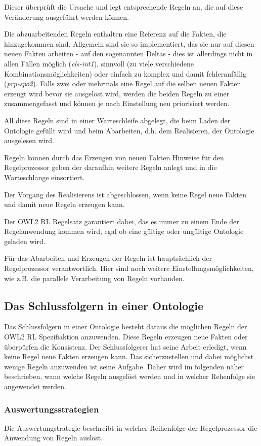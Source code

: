 Dieser überprüft die Ursache und legt entsprechende Regeln an, die auf diese Veränderung ausgeführt werden können.

Die abzuarbeitenden Regeln enthalten eine Referenz auf die Fakten, die hinzugekommen sind. Allgemein sind sie so implementiert, das sie nur auf diesen neuen Fakten arbeiten -  auf den sogenannten Deltas - dies ist allerdings nicht in allen Fällen möglich (\emph{cls-int1}), sinnvoll (zu viele verschiedene Kombinationsmöglichkeiten) oder einfach zu komplex und damit fehleranfällig (\emph{prp-spo2}). Falls zwei oder mehrmals eine Regel auf die selben neuen Fakten erzeugt wird bevor sie ausgelöst wird, werden die beiden Regeln zu einer zusammengefasst und können je nach Einstellung neu priorisiert werden.

All diese Regeln sind in einer Warteschleife abgelegt, die beim Laden der Ontologie gefüllt wird und beim Abarbeiten, d.h. dem Realisieren, der Ontologie ausgelesen wird.

Regeln können durch das Erzeugen von neuen Fakten Hinweise für den Regelprozessor geben der daraufhin weitere Regeln anlegt und in die Warteschlange einsortiert.

Der Vorgang des Realisierens ist abgeschlossen, wenn keine Regel neue Fakten und damit neue Regeln erzeugen kann.

Der OWL2 RL Regelsatz garantiert dabei, das es immer zu einem Ende der Regelanwendung kommen wird, egal ob eine gültige oder ungültige Ontologie geladen wird.

Für das Abarbeiten und Erzeugen der Regeln ist hauptsächlich der Regelprozessor verantwortlich. Hier sind noch weitere Einstellungsmöglichkeiten, wie z.B. die parallele Verarbeitung von Regeln vorhanden.


\subsection{Das Schlussfolgern in einer Ontologie}
Das Schlussfolgern in einer Ontologie besteht daraus die möglichen Regeln der OWL2 RL Spezifiaktion anzuwenden. Diese Regeln erzeugen neue Fakten oder überpürfen die Konsistenz. Der Schlussfolgerer hat seine Arbeit erledigt, wenn keine Regel neue Fakten erzeugen kann. Das sicherzustellen und dabei möglichst wenige Regeln anzuwenden ist seine Aufgabe. Daher wird im folgenden näher beschrieben, wann welche Regeln ausgelöst werden und in welcher Rehenfolge sie angewendet werden.

\subsubsection{Auswertungsstrategien}
Die Auswertungstrategie beschreibt in welcher Reihenfolge der Regelprozessor die Anwendung von Regeln auslöst. 

